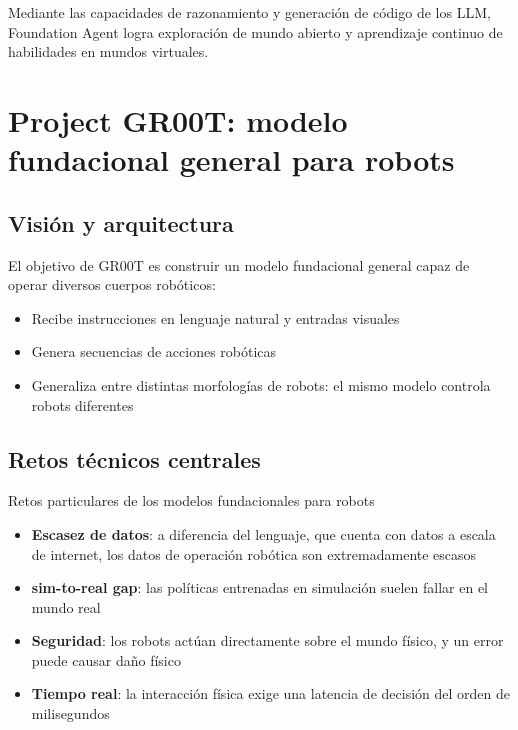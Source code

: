 \documentclass[a4paper]{article}
\begin{document}
Mediante las capacidades de razonamiento y generación de código de los LLM, Foundation Agent logra exploración de mundo abierto y aprendizaje continuo de habilidades en mundos virtuales.

\section{Project GR00T: modelo fundacional general para robots}

\subsection{Visión y arquitectura}

El objetivo de GR00T es construir un modelo fundacional general capaz de operar diversos cuerpos robóticos:

\begin{itemize}
    \item Recibe instrucciones en lenguaje natural y entradas visuales
    \item Genera secuencias de acciones robóticas
    \item Generaliza entre distintas morfologías de robots: el mismo modelo controla robots diferentes
\end{itemize}

\subsection{Retos técnicos centrales}

\begin{warningbox}{Retos particulares de los modelos fundacionales para robots}
\begin{itemize}
    \item \textbf{Escasez de datos}: a diferencia del lenguaje, que cuenta con datos a escala de internet, los datos de operación robótica son extremadamente escasos
    \item \textbf{sim-to-real gap}: las políticas entrenadas en simulación suelen fallar en el mundo real
    \item \textbf{Seguridad}: los robots actúan directamente sobre el mundo físico, y un error puede causar daño físico
    \item \textbf{Tiempo real}: la interacción física exige una latencia de decisión del orden de milisegundos
\end{itemize}
\end{warningbox}
\end{document}
